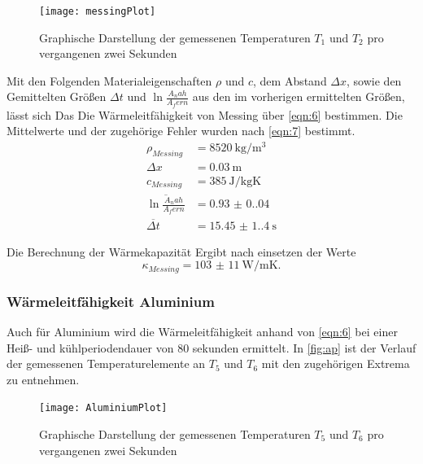 \begin{figure}[H]
  \label{fig:mp}
  \centering
  \caption{Graphische Darstellung der gemessenen Temperaturen $T_1$ und $T_2$ pro vergangenen zwei Sekunden}
  \texttt{[image: messingPlot]}
\end{figure}

\noindent Mit den Folgenden Materialeigenschaften $\rho$ und $c$, dem Abstand $\Delta x$, sowie den
Gemittelten Größen $\Delta t $ und $ \ln{\frac{A_nah}{A_fern}}$ aus den im vorherigen ermittelten Größen,
lässt sich Das Die Wärmeleitfähigkeit von Messing über \autoref{eqn:6} bestimmen. Die Mittelwerte und
der zugehörige Fehler wurden nach \autoref{eqn:7} bestimmt.
\begin{align*}
  \rho_{Messing}                                &= \qty{8520}{\kilo\gram\per\cubic\meter}\\
  \Delta x                              &= \qty{0.03}{\meter}\\
  c_{Messing}                                   &= \qty{385}{\joule\per\kilo\gram\kelvin}\\
  \overline{\ln{\frac{A_nah}{A_fern}}}  &= \qty{0.93(0.04)}{}\\
  \overline{\Delta t}                   &= \qty{15.45(1.4)}{\second}
\end{align*}

\noindent Die Berechnung der Wärmekapazität Ergibt nach einsetzen der Werte
\begin{equation}
  \kappa_{Messing} = \qty{103(11)}{\watt\per\meter\kelvin}.
\end{equation}

\subsubsection{Wärmeleitfähigkeit Aluminium}
Auch für Aluminium wird die Wärmeleitfähigkeit anhand von \autoref{eqn:6} bei einer Heiß- und 
kühlperiodendauer von 80 sekunden ermittelt. In \autoref{fig:ap} ist der Verlauf der gemessenen 
Temperaturelemente an $T_5$ und $T_6$ mit den zugehörigen Extrema zu entnehmen.
\begin{figure}[H]
  \label{fig:ap}
  \centering
  \caption{Graphische Darstellung der gemessenen Temperaturen $T_5$ und $T_6$ pro vergangenen zwei Sekunden}
  \texttt{[image: AluminiumPlot]}
\end{figure}

